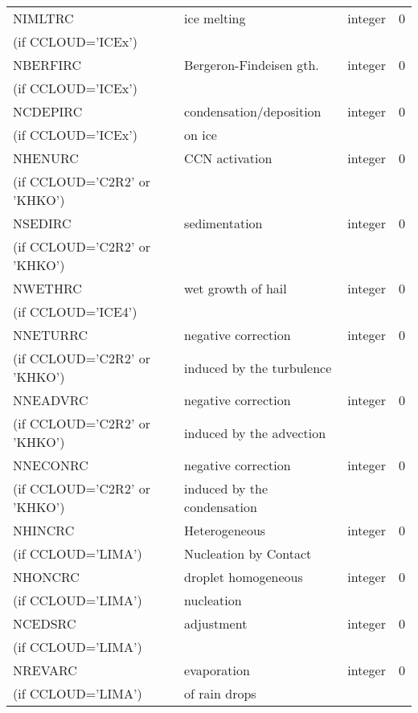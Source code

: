 \begin{center}
\begin{tabular} {|p{8cm}|p{4cm}|>{\centering}p{1.5cm}|p{1.5cm}<{\centering}|}
NIMLTRC   & ice melting & integer  &  0 \index{NIMLTRC!\innam{NAM\_BU\_RRC}}\\
(if CCLOUD='ICEx') & &   &  \\\hline
NBERFIRC  & Bergeron-Findeisen gth. & integer  &  0 \index{NBERFIRC!\innam{NAM\_BU\_RRC}}\\
(if CCLOUD='ICEx') & &   &  \\\hline
NCDEPIRC  & condensation/deposition & integer  &  0 \index{NDEPIRC!\innam{NAM\_BU\_RRC}}\\
(if CCLOUD='ICEx') &on ice &   &  \\\hline
NHENURC  & CCN activation  & integer  &  0 \index{NHENURC!\innam{NAM\_BU\_RRC}}\\
(if CCLOUD='C2R2' or 'KHKO') & &   &  \\\hline
NSEDIRC  & sedimentation & integer  &  0 \index{NHENURC!\innam{NAM\_BU\_RRC}}\\
(if CCLOUD='C2R2' or 'KHKO') & &   &  \\\hline
NWETHRC  & wet growth of hail & integer  &  0 \index{NWETHRC!\innam{NAM\_BU\_RRC}}\\
(if CCLOUD='ICE4') & &   &  \\\hline
NNETURRC  &negative correction   & integer  &  0 \index{NNETURRC!\innam{NAM\_BU\_RRC}}\\
(if CCLOUD='C2R2' or 'KHKO') & induced by the turbulence&   &  \\\hline
NNEADVRC  & negative correction  & integer  &  0 \index{NNEADVRC!\innam{NAM\_BU\_RRC}}\\
(if CCLOUD='C2R2' or 'KHKO') & induced by the advection&   &  \\\hline
NNECONRC  &negative correction    & integer  &  0 \index{NNECONRC!\innam{NAM\_BU\_RRC}}\\
(if CCLOUD='C2R2' or 'KHKO') &induced by the condensation &   &  \\\hline
NHINCRC  & Heterogeneous  & integer  &  0 \index{NHINCRC!\innam{NAM\_BU\_RRC}}\\
(if CCLOUD='LIMA') &Nucleation by Contact &   &  \\\hline
NHONCRC  & droplet homogeneous   & integer  &  0 \index{NHONCRC!\innam{NAM\_BU\_RRC}}\\
(if CCLOUD='LIMA') & nucleation&   &  \\\hline
NCEDSRC  & adjustment  & integer  &  0 \index{NCEDSRC!\innam{NAM\_BU\_RRC}}\\
(if CCLOUD='LIMA') & &   &  \\\hline
NREVARC  & evaporation   & integer  &  0 \index{NREVARC!\innam{NAM\_BU\_RRC}}\\
(if CCLOUD='LIMA') & of rain drops &   &  \\\hline
\hline
\end{tabular}
\end{center}
\newpage
